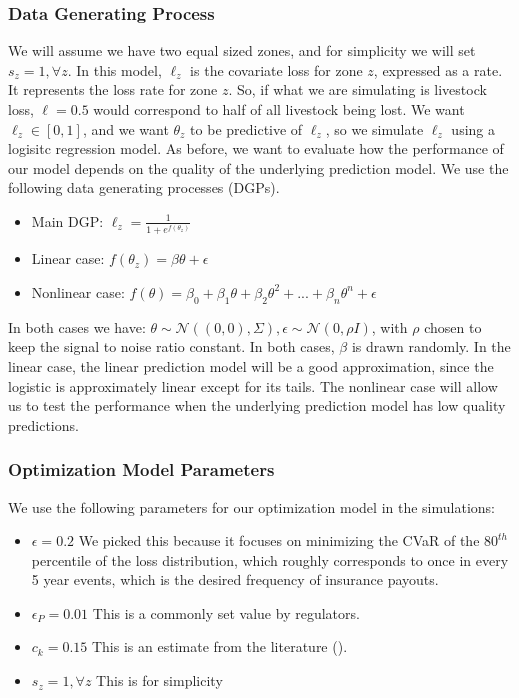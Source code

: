 \documentclass[11pt]{article}
\begin{document}
    \subsubsection{Data Generating Process}
    We will assume we have two equal sized zones, and for simplicity we will set $s_z = 1, \forall z$. In this model, $\ell_z$ is the covariate loss for zone $z$, expressed as a rate. It represents the loss rate for zone $z$. So, if what we are simulating is livestock loss, $\ell=0.5$ would correspond to half of all livestock being lost. We want $\ell_z \in [0,1]$, and we want $\theta_z$ to be predictive of $\ell_z$, so we simulate $\ell_z$ using a logisitc regression model. As before, we want to evaluate how the performance of our model depends on the quality of the underlying prediction model. We use the following data generating processes (DGPs).

    \begin{itemize}
        \item Main DGP: $\ell_z = \frac{1}{1+e^{f(\theta_z)}}$
        \item Linear case: $f(\theta_z) = \beta \theta + \epsilon$
        \item Nonlinear case: $f(\theta) = \beta_0 + \beta_1 \theta + \beta_2 \theta^2 + ... + \beta_n \theta^n+ \epsilon$
    \end{itemize}

    In both cases we have: $\theta \sim \mathcal{N}((0,0),\Sigma), \epsilon \sim \mathcal{N}(0,\rho I)$, with $\rho$ chosen to keep the signal to noise ratio constant. In both cases, $\beta$ is drawn randomly. In the linear case, the linear prediction model will be a good approximation, since the logistic  is approximately linear except for its tails. The nonlinear case will allow us to test the performance when the underlying prediction model has low quality predictions. 

    \subsubsection{Optimization Model Parameters}
      We use the following parameters for our optimization model in the simulations:

      \begin{itemize}
        \item $\epsilon=0.2$ We picked this because it focuses on minimizing the CVaR of the $80^{th}$ percentile of the loss distribution, which roughly corresponds to once in every 5 year events, which is the desired frequency of insurance payouts.  
        \item $\epsilon_P=0.01$ This is a commonly set value by regulators.  
        \item $c_k=0.15$ This is an estimate from the literature (\cite{kielholz2000cost}). 
        \item $s_z = 1, \forall z$ This is for simplicity
     \end{itemize}
\end{document}
